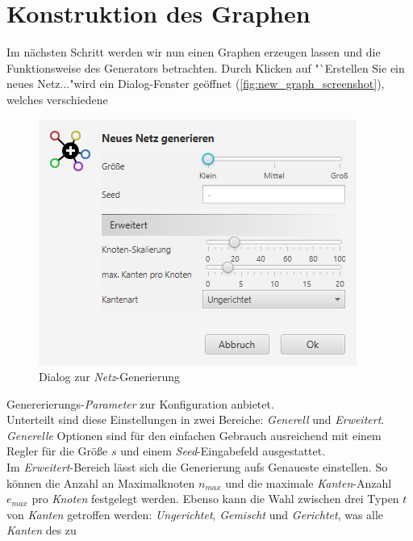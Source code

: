 \documentclass[12pt]{article}
\begin{document}
\section{Konstruktion des Graphen}
\label{sec:construct}
Im nächsten Schritt werden wir nun einen Graphen erzeugen lassen und die Funktionsweise des Generators betrachten. 
Durch Klicken auf "`Erstellen Sie ein neues Netz..."\;wird ein Dialog-Fenster geöffnet (\autoref{fig:new_graph_screenshot}), welches verschiedene 
\begin{figure}
\vspace{-20pt}
\begin{center}
\includegraphics[scale=0.6]{res/new_graph_screenshot.png}
\end{center}
\vspace{-20pt}
\centering
\caption{Dialog zur \textit{Netz}-Generierung}
\label{fig:new_graph_screenshot}
\end{figure}
Genererierungs-\textit{Parameter} zur Konfiguration anbietet. 
\\
Unterteilt sind diese Einstellungen in zwei Bereiche: \textit{Generell} und \textit{Erweitert}. \textit{Generelle} Optionen sind für den einfachen Gebrauch ausreichend mit einem Regler für die Größe $s$ und einem 
\textit{Seed}-Eingabefeld ausgestattet.  %
\\
Im \textit{Erweitert}-Bereich lässt sich die Generierung aufs Genaueste einstellen. So können die Anzahl an Maximalknoten $n_{max}$ und die maximale \textit{Kanten}-Anzahl $e_{max}$ pro \textit{Knoten} 
festgelegt werden. Ebenso kann die Wahl zwischen drei Typen $t$ von \textit{Kanten} getroffen werden: \textit{Ungerichtet}, \textit{Gemischt} und \textit{Gerichtet}, was alle \textit{Kanten} des zu 
\end{document}
